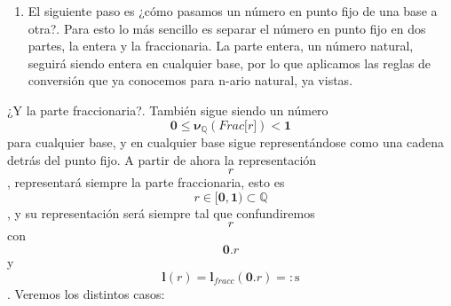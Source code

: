 \begin{enumerate}
\begin{enumerate}
\begin{enumerate}
      \[{\mathit{r} = {{\mathit{{Ent}{\lbrack r\rbrack}} \cdot \mathbf{\mathrm{.}}} \cdot \mathit{{Frac}{\lbrack r\rbrack}}}} \in {{{{\mathbf{d}_{\mathbf{\mathrm{\iota \neq 0}}} \cdot \left\lbrack \mathbf{D}_{\mathbf{\mathrm{n}}} \right\rbrack^{\mathbf{\mathrm{\ast}}}} \cdot \mathbf{\mathrm{.}}} \cdot \left\lbrack \mathbf{D}_{\mathbf{\mathrm{n}}} \right\rbrack^{\mathbf{\mathrm{\ast}}}} \cdot \mathbf{d}_{\mathbf{\mathrm{\iota \neq 0}}}}\]
      y
      \[\mathbf{l}{{(\mathit{r})} = \mathbf{l}_{\mathbf{\mathrm{\mathit{frac}}}}}{{(\mathit{r})} + \mathbf{l}_{\mathbf{\mathrm{\mathit{ent}}}}}{(\mathit{r})}\].
      Para evaluar el valor de la representación la fórmula es la
      clásica
      \[\mathbf{\nu}_{\mathbb{Q}}{{(\mathit{r})} = {\sum\limits_{\mathbf{\mathrm{\iota}} = \mathbf{\mathrm{\mathit{l}{(\mathit{{{Ent}{\lbrack r\rbrack}} - 1})}}}}^{\mathbf{\mathrm{{- \mathit{l}}{(\mathit{{Frac}{\lbrack r\rbrack}})}}}}\left( {{\mathbf{\nu}{(\mathit{r}_{\mathbf{\mathrm{\iota}}})}} \cdot \mathbf{n}^{\mathbf{\mathrm{\iota}}}} \right)}}\].
      En general aunque ponemos explícita\-mente el punto, no es
      necesario una vez se conocen la longitudes de las partes entera y
      fraccionaria.
    \item
      El siguiente paso es ¿cómo pasamos un número en punto fijo de una
      base a otra?. Para esto lo más sencillo es separar el número en
      punto fijo en dos partes, la entera y la fraccionaria. La parte
      entera, un número natural, seguirá siendo entera en cualquier
      base, por lo que aplicamos las reglas de conversión que ya
      conocemos para n-ario na\-tural, ya vistas.
    \end{enumerate}

    ¿Y la parte fraccionaria?. También sigue siendo un número
    \[{\mathbf{0} \leq \mathbf{\nu}_{\mathbb{Q}}}{{({\mathit{Frac}{\lbrack r\rbrack}})} < \mathbf{1}}\]para
    cualquier base, y en cualquier base sigue representándose como una
    cadena de\-trás del punto fijo. A partir de ahora la representación
    \[\mathit{r}\], representará siempre la parte fraccionaria, esto es
    \[{\mathit{r} \in \lbrack}\mathbf{0},\mathbf{1}{) \subset \mathbb{Q}}\]
    , y su representación será siempre tal que confundiremos
    \[\mathit{r}\]con \[\mathbf{0}.\mathit{r}\]y
    \[\mathbf{l}{{(\mathit{r})} = \mathbf{l}_{\mathbf{\mathrm{\mathit{fracc}}}}}{{({\mathbf{0}.\mathit{r}})} = :}\mathbf{\mathrm{s}}\].
    Veremos los distintos ca\-sos:


\end{enumerate}
\end{enumerate}

